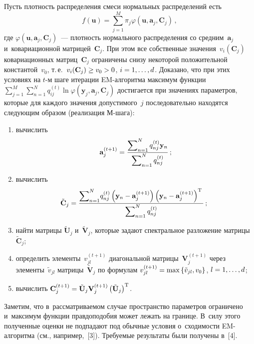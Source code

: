 \begin{multicols}{2}
     Пусть плотность распределения смеси нормальных распределений есть
     $$
     f(\mathbf{u}) =\sum\limits^M_{j=1} \pi_j \varphi\left( \mathbf{u}, 
\mathbf{a}_j, \mathbf{C}_j\right)\,,
     $$ 
где $\varphi(\mathbf{u},\mathbf{a}_j,\mathbf{C}_j)$~--- плотность нормального 
рас\-пределения со средним~$\mathbf{a}_j$ и~ковариационной\linebreak 
мат\-ри\-цей~$\mathbf{C}_j$. При этом все собственные 
значения~$v_i(\mathbf{C}_j)$ ковариационных матриц~$\mathbf{C}_j$ 
ограничены снизу некоторой положительной константой~$v_0$, т.\,е.\ 
$v_i(\mathbf{C}_j)\hm\geq v_0\hm>0$, $i\hm=1,\ldots ,d$. Доказано, что при этих 
условиях на $t$-м шаге итерации EM-ал\-го\-рит\-ма максимум функции 
$\sum\nolimits^M_{j=1} \sum\nolimits^N_{n=1} q_{ij}^{(t)} \ln \varphi 
(\mathbf{y}_j, \mathbf{a}_j, \mathbf{C}_j)$ достигается при значениях 
параметров, которые для каждого значения допустимого~$j$ последовательно 
находятся следующим образом (реализация М-шага):
\begin{enumerate}[(1)]
\item вычислить 
$$
\mathbf{a}_j^{(t+1)}= \displaystyle\frac{\displaystyle \sum\nolimits^N_{n=1} q_{nj}^{(t)} \mathbf{y}_n\mathstrut}{\displaystyle \sum\nolimits^N_{n=1} q_{nj}^{(t)}\mathstrut}\,;
     $$
\item вычислить 
$$
\hspace*{-4.69887pt}\tilde{\mathbf{C}}_j=
\displaystyle\frac{\displaystyle \sum\nolimits^N_{n=1}\! q_{nj}^{(t)} \left( 
\mathbf{y}_n -\mathbf{a}_j^{(t+1)}\right) \left( \mathbf{y}_n-
\mathbf{a}_j^{(t+1)}\right)^{\mathrm{T}}\mathstrut}{\displaystyle \sum\nolimits^N_{n=1} 
q_{nj}^{(t)}\mathstrut}\,;
     $$
\item найти матрицы $\tilde{\mathbf{U}}_j$ и~$\tilde{\mathbf{V}}_j$, которые 
задают спектральное разложение матрицы~$\tilde{\mathbf{C}}_j$;
\item определить элементы~$v_{jl}^{(t+1)}$ диагональной 
мат\-ри\-цы~$\mathbf{V}_j^{(t+1)}$ через элементы~$\tilde{v}_{jl}$ 
мат\-ри\-цы~$\tilde{\mathbf{V}}_j$ по формулам $v_{jl}^{(t+1)}\hm= \max 
\left\{ \tilde{v}_{jl}, v_0\right\}$, $l\hm=1, \ldots , d$;
\item вычислить $\mathbf{C}_j^{(t+1)} \hm= \tilde{\mathbf{U}}_j 
\mathbf{V}_j^{(t+1)} \left( \tilde{\mathbf{U}}_j\right)^{\mathrm{T}}$.
     \end{enumerate}
     
     Заметим, что в~рассматриваемом случае пространство параметров 
ограничено и~максимум функции правдоподобия может лежать на границе. 
В~силу этого полученные оценки не подпадают под обычные условия 
о~сходимости EM-ал\-го\-рит\-ма (см., например,~[3]). Требуемые результаты 
были получены в~[4].
     

\end{multicols}
